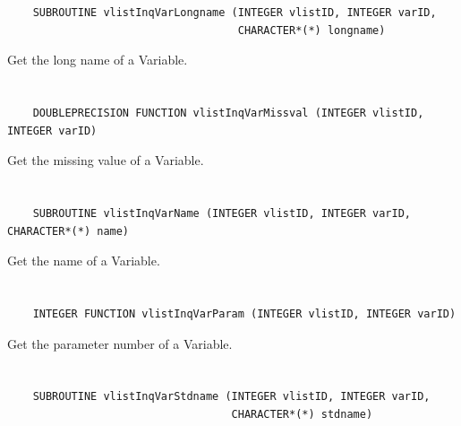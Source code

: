 \begin{verbatim}
    SUBROUTINE vlistInqVarLongname (INTEGER vlistID, INTEGER varID,
                                    CHARACTER*(*) longname)
\end{verbatim}

Get the long name of a Variable.


\section*{\tt {}}

\begin{verbatim}
    DOUBLEPRECISION FUNCTION vlistInqVarMissval (INTEGER vlistID, INTEGER varID)
\end{verbatim}

Get the missing value of a Variable.


\section*{\tt {}}

\begin{verbatim}
    SUBROUTINE vlistInqVarName (INTEGER vlistID, INTEGER varID, CHARACTER*(*) name)
\end{verbatim}

Get the name of a Variable.


\section*{\tt {}}

\begin{verbatim}
    INTEGER FUNCTION vlistInqVarParam (INTEGER vlistID, INTEGER varID)
\end{verbatim}

Get the parameter number of a Variable.


\section*{\tt {}}

\begin{verbatim}
    SUBROUTINE vlistInqVarStdname (INTEGER vlistID, INTEGER varID,
                                   CHARACTER*(*) stdname)
\end{verbatim}

